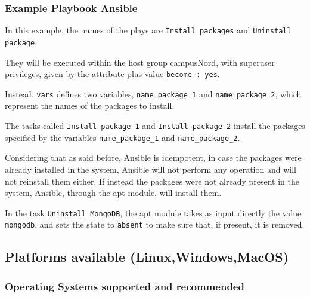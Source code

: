 \documentclass[12pt,a4paper,openright,twoside]{book}
\begin{document}
\subsubsection{Example Playbook Ansible}



In this example, the names of the plays are \texttt{Install packages} and \texttt{Uninstall package}.

They will be executed within the host group campusNord, with superuser privileges, given by the attribute plus value \texttt{become : yes}.

Instead, \texttt{vars} defines two variables, \texttt{name_package_1} and \texttt{name_package_2}, which represent the names of the packages to install.

The tasks called \texttt{Install package 1} and \texttt{Install package 2} install the packages specified by the variables \texttt{name_package_1} and \texttt{name_package_2}.

Considering that as said before, Ansible is idempotent, in case the packages were already installed in the system, Ansible will not perform any operation and will not reinstall them either. If instead the packages were not already present in the system, Ansible, through the apt module, will install them.

In the task \texttt{Uninstall MongoDB}, the apt module takes as input directly the value \texttt{mongodb}, and sets the state to \texttt{absent} to make sure that, if present, it is removed.




\subsection{Platforms available (Linux,Windows,MacOS)}
\subsubsection{Operating Systems supported and recommended}
\end{document}
